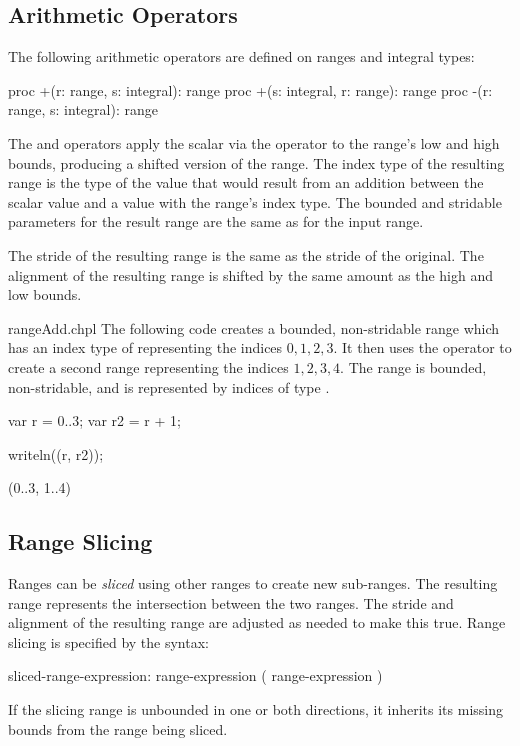 \subsection{Arithmetic Operators}
\label{Range_Arithmetic}

The following arithmetic operators are defined on ranges and integral
types:

\begin{chapel}
proc +(r: range, s: integral): range
proc +(s: integral, r: range): range
proc -(r: range, s: integral): range
\end{chapel}

The \chpl{+} and \chpl{-} operators apply the scalar via the operator
to the range's low and high bounds, producing a shifted version of the
range.  The index type of the resulting range is the type of the value
that would result from an addition between the scalar value and a value
with the range's index type.  The bounded and stridable parameters for
the result range are the same as for the input range.

The stride of the resulting range is the same as the stride of the
original. The alignment of the resulting range is shifted by the same amount as
the high and low bounds.

\begin{chapelexample}{rangeAdd.chpl}
The following code creates a bounded, non-stridable range 
which has an index type of  representing the indices ${0,
  1, 2, 3}$.  It then uses the \chpl{+} operator to
create a second range  representing the indices ${1, 2, 3,
  4}$.  The  range is bounded, non-stridable, and is represented by
indices of type .
\begin{chapel}
var r = 0..3;
var r2 = r + 1;
\end{chapel}
\begin{chapelpost}
writeln((r, r2));
\end{chapelpost}
\begin{chapeloutput}
(0..3, 1..4)
\end{chapeloutput}
\end{chapelexample}


\subsection{Range Slicing}
\label{Range_Slicing}

Ranges can be \emph{sliced} using other ranges to create new
sub-ranges.  The resulting range represents the intersection between
the two ranges.  The stride and alignment of the resulting range are adjusted as
needed to make this true.  Range slicing is specified by the syntax:
\begin{syntax}
sliced-range-expression:
  range-expression ( range-expression )
\end{syntax}
\noindent If the slicing range is unbounded in one or both directions, it
inherits its missing bounds from the range being sliced.

